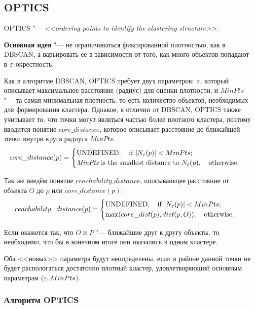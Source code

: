 \subsection{OPTICS}
OPTICS "--- {\it <<ordering points to identify the clustering structure>>. }


{\bf Основная идея} "--- не ограничиваться фиксированной плотностью, как в DBSCAN, а варьировать ее в зависимости от того, как много объектов попадают в $\varepsilon$-окрестность.

Как в алгоритме DBSCAN, OPTICS требует двух параметров: $\varepsilon$, который описывает максимальное расстояние (радиус) для оценки плотности, и $MinPts$ "--- та самая минимальная плотность, то есть количество объектов, необходимых для формирования кластера. 
Однакое, в отличии от DBSCAN, OPTICS также учитывает то, что точки могут являться частью более плотного кластера, поэтому вводится понятие $core\_distance$, которое описывает расстояние до ближайшей точки внутри круга радиуса $MinPts$.
\[
core\_distance(p) = 
\begin{cases}
\mathrm{UNDEFINED},\quad \text{if } |N_{\varepsilon} (p)| < MinPts;\\
\text{{\it MinPts} is the smallest distance to } N_{\varepsilon}(p), \quad \mathrm{otherwise}.
\end{cases}
\]

Так же введём понятие $reachability\_distance$, описывающее расстояние от объекта $O$ до $p$ или $core\_distance(p)$:
\[
reachability\_distance(p) = 
\begin{cases}
\mathrm{UNDEFINED},\quad \text{if } |N_{\varepsilon} (p)| < MinPts;\\
\max(core\_dist(p),dist(p,O)), \quad \mathrm{otherwise}.
\end{cases}
\]

Если окажется так, что $O$ и $P$ "--- ближайшие друг к другу объекты, то необходимо, что бы в конечном итоге они оказались в одном кластере.

Оба <<новых>> параметра будут неопределены, если в районе данной точки не будет распологаться достаточно плотный кластер, удовлетворяющий основным параметрам ($\varepsilon, MinPts$).

\subsubsection{Алгоритм OPTICS}

